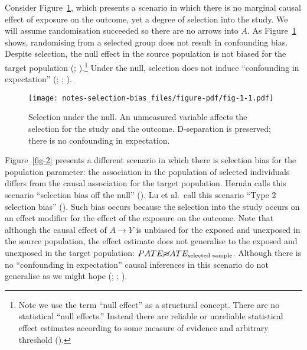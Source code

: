 \documentclass[
  singlecolumn,
  9pt]{article}
\begin{document}
Consider Figure~\ref{fig-1}, which presents a scenario in which there is
no marginal causal effect of exposure on the outcome, yet a degree of
selection into the study. We will assume randomisation succeeded so
there are no arrows into \(A\). As Figure~\ref{fig-1} shows, randomising
from a selected group does not result in confounding bias. Despite
selection, the null effect in the source population is not biased for
the target population (;
).\footnote{Note we use the
  term ``null effect'' as a structural concept. There are no statistical
  ``null effects.'' Instead there are reliable or unreliable statistical
  effect estimates according to some measure of evidence and arbitrary
  threshold ().}
Under the null, selection does not induce ``confounding in expectation''
(;
;
).

\begin{figure}

{\centering \texttt{[image: notes-selection-bias\_files/figure-pdf/fig-1-1.pdf]}

}

\caption{\label{fig-1}Selection under the null. An unmeasured variable
affects the selection for the study and the outcome. D-separation is
preserved; there is no confounding in expectation.}

\end{figure}

Figure~\ref{fig-2} presents a different scenario in which there is
selection bias for the population parameter: the association in the
population of selected individuals differs from the causal association
for the target population. Hernán calls this scenario ``selection bias
off the null'' (). Lu et
al.~call this scenario ``Type 2 selection bias''
(). Such bias occurs because
the selection into the study occurs on an effect modifier for the effect
of the exposure on the outcome. Note that although the causal effect of
\(A\to Y\) is unbiased for the exposed and unexposed in the source
population, the effect estimate does not generalise to the exposed and
unexposed in the target population:
\(PATE \cancel{\approx} ATE_{\text{selected sample}}\). Although there
is no ``confounding in expectation'' causal inferences in this scenario
do not generalise as we might hope (; ; ).
\end{document}
